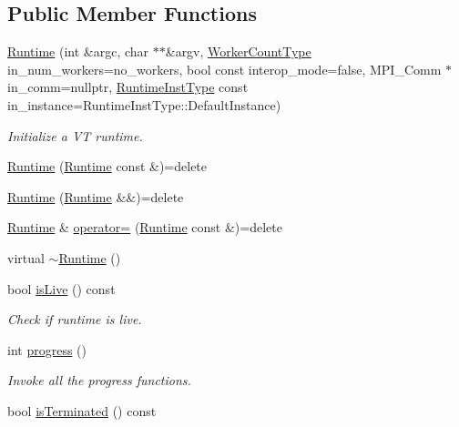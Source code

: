 \subsection*{Public Member Functions}
\begin{DoxyCompactItemize}
\item 
\hyperlink{structvt_1_1runtime_1_1_runtime_a887f6037ec367f708ee84b4dcc1397b4}{Runtime} (int \&argc, char $\ast$$\ast$\&argv, \hyperlink{namespacevt_aa93398ea48f2cb6c188512250f7cc248}{Worker\+Count\+Type} in\+\_\+num\+\_\+workers=no\+\_\+workers, bool const interop\+\_\+mode=false, M\+P\+I\+\_\+\+Comm $\ast$in\+\_\+comm=nullptr, \hyperlink{namespacevt_1_1runtime_afca910c1b38b3975f7c1da8001a77d58}{Runtime\+Inst\+Type} const in\+\_\+instance=Runtime\+Inst\+Type\+::\+Default\+Instance)
\begin{DoxyCompactList}\small\item\em Initialize a VT runtime. \end{DoxyCompactList}\item 
\hyperlink{structvt_1_1runtime_1_1_runtime_a42d87d965f2a283dbaf484b36b6a0c39}{Runtime} (\hyperlink{structvt_1_1runtime_1_1_runtime}{Runtime} const \&)=delete
\item 
\hyperlink{structvt_1_1runtime_1_1_runtime_a146708e42fa94f4d50bfdd6159f4d642}{Runtime} (\hyperlink{structvt_1_1runtime_1_1_runtime}{Runtime} \&\&)=delete
\item 
\hyperlink{structvt_1_1runtime_1_1_runtime}{Runtime} \& \hyperlink{structvt_1_1runtime_1_1_runtime_a30e1ddf6dd4950488044cf9608402193}{operator=} (\hyperlink{structvt_1_1runtime_1_1_runtime}{Runtime} const \&)=delete
\item 
virtual \hyperlink{structvt_1_1runtime_1_1_runtime_ae164ab301b823d985a62b7a5fb62cf07}{$\sim$\+Runtime} ()
\item 
bool \hyperlink{structvt_1_1runtime_1_1_runtime_a811947d9ba7322d0cb10c246200037c8}{is\+Live} () const
\begin{DoxyCompactList}\small\item\em Check if runtime is live. \end{DoxyCompactList}\item 
int \hyperlink{structvt_1_1runtime_1_1_runtime_a90748cf763f3e774934ee8c4b06a7303}{progress} ()
\begin{DoxyCompactList}\small\item\em Invoke all the progress functions. \end{DoxyCompactList}\item 
bool \hyperlink{structvt_1_1runtime_1_1_runtime_a2c2561be8be311f01e11fc8e10725c77}{is\+Terminated} () const
$$
\end{DoxyCompactItemize}
